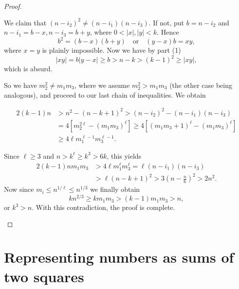 \begin{proof}
\begin{enumerate}
    We claim that \((n - i_2)^2 \ne (n - i_1)(n - i_3)\). If not, put \(b = n - i_2\)
    and \(n - i_1 = b - x, n - i_3 = b + y\), where \(0 < |x|, |y| < k\). Hence
    \[
    b^2 = (b - x)(b + y) \quad \text{or} \quad (y - x)b = xy,
    \]
    where \(x = y\) is plainly impossible. Now we have by part (1)
    \[
    |xy| = b |y - x| \ge b > n - k > (k - 1)^2 \ge |xy|,
    \]
    which is absurd.

    So we have \(m_2^2 \ne m_1 m_3\), where we assume \(m_2^2 > m_1 m_3\) (the other case being analogous),
    and proceed to our last chain of inequalities. We obtain

    \begin{align*}
    2(k - 1)n & > n^2 - (n - k + 1)^2 > (n - i_2)^2 - (n - i_1)(n - i_3)\\
     & = 4[m_2^{2\ell} - (m_1 m_3)^\ell] \ge 4[(m_1 m_3 + 1)^\ell - (m_1 m_3)^\ell] \\
     & \ge 4 \ell m_1^{\ell-1} m_3^{\ell-1}.
    \end{align*}

    Since \(\ell \ge 3\) and \(n > k^\ell \ge k^3 > 6k\), this yields
    \begin{align*}
    2(k - 1)n m_1 m_3 & > 4 \ell m_1^\ell m_3^\ell = \ell (n - i_1)(n - i_3) \\
                      & > \ell (n - k + 1)^2 > 3 \left(n - \frac{n}{6}\right)^2 > 2n^2.
    \end{align*}
    Now since \(m_i \le n^{1/\ell} \le n ^{1/3}\) we finally obtain
    \[
    kn^{2/3} \ge km_1m_3 > (k - 1)m_1m_3 > n,
    \]
    or \(k^3 > n\). With this contradiction, the proof is complete. \qedhere
    \end{enumerate}
\end{proof}


\chapter{Representing numbers as sums of two squares}

